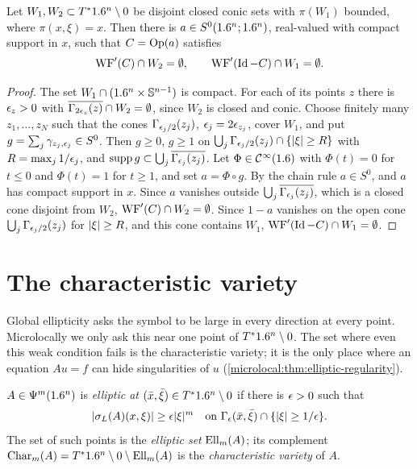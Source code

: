 \begin{lemma}\label{microlocal:lem:cutoff}
  Let $W_1,W_2\subset T^*1.6^n\setminus0$ be disjoint closed conic sets with $\pi(W_1)$
  bounded, where $\pi(x,\xi)=x$. Then there is $a\in S^0(1.6^n;1.6^n)$,
  real-valued with compact support in $x$, such that $C=\operatorname{Op}(a)$ satisfies
  \begin{equation*}
    \operatorname{WF}'(C)\cap W_2=\emptyset,\qquad\operatorname{WF}'(\operatorname{Id}-C)\cap W_1=\emptyset .
  \end{equation*}
\end{lemma}
\begin{proof}
  The set $W_1\cap(1.6^n\times\mathbb{S}^{n-1})$ is compact. For each of its
  points $z$ there is $\epsilon_z>0$ with $\overline{\Gamma_{2\epsilon_z}(z)}\cap
  W_2=\emptyset$, since $W_2$ is closed and conic. Choose finitely many
  $z_1,\dots,z_N$ such that the cones $\Gamma_{\epsilon_j/2}(z_j)$,
  $\epsilon_j=2\epsilon_{z_j}$, cover $W_1$, and put
  $g=\sum_j\gamma_{z_j,\epsilon_j}\in S^0$. Then $g\ge0$, $g\ge1$ on
  $\bigcup_j\Gamma_{\epsilon_j/2}(z_j)\cap\{\lvert \xi\rvert\ge R\}$ with
  $R=\max_j1/\epsilon_j$, and $\operatorname{supp} g\subset\bigcup_j\overline{\Gamma_{\epsilon_j}(z_j)}$.
  Let $\Phi\in\mathcal{C}^\infty(1.6)$ with $\Phi(t)=0$ for $t\le0$ and $\Phi(t)=1$ for
  $t\ge1$, and set $a=\Phi\circ g$. By the chain rule $a\in S^0$, and
  $a$ has compact support in $x$. Since $a$ vanishes outside
  $\bigcup_j\overline{\Gamma_{\epsilon_j}(z_j)}$, which is a closed cone disjoint
  from $W_2$, $\operatorname{WF}'(C)\cap W_2=\emptyset$. Since $1-a$ vanishes on the open
  cone $\bigcup_j\Gamma_{\epsilon_j/2}(z_j)$ for $\lvert \xi\rvert\ge R$, and this cone
  contains $W_1$, $\operatorname{WF}'(\operatorname{Id}-C)\cap W_1=\emptyset$.
\end{proof}

\section{The characteristic variety}\label{microlocal:sec:char}

Global ellipticity asks the symbol to be large in every direction at every
point. Microlocally we only ask this near one point of $T^*1.6^n\setminus0$. The set
where even this weak condition fails is the characteristic variety; it is the
only place where an equation $Au=f$ can hide singularities of $u$
(\cref{microlocal:thm:elliptic-regularity}).

\begin{definition}\label{microlocal:def:elliptic}
  $A\in\Psi^{m}(1.6^n)$ is \emph{elliptic at} $(\bar x,\bar\xi)\in T^*1.6^n\setminus0$
  if there is $\epsilon>0$ such that
  \begin{equation*}
    \lvert \sigma_L(A)(x,\xi)\rvert\ge\epsilon\lvert \xi\rvert^m\quad\text{on }
    \Gamma_\epsilon(\bar x,\bar\xi)\cap\{\lvert \xi\rvert\ge1/\epsilon\}.
  \end{equation*}
  The set of such points is the \emph{elliptic set} $\operatorname{Ell}_m(A)$; its
  complement $\operatorname{Char}_m(A)=T^*1.6^n\setminus0\setminus\operatorname{Ell}_m(A)$ is the
  \emph{characteristic variety} of $A$.
\end{definition}

